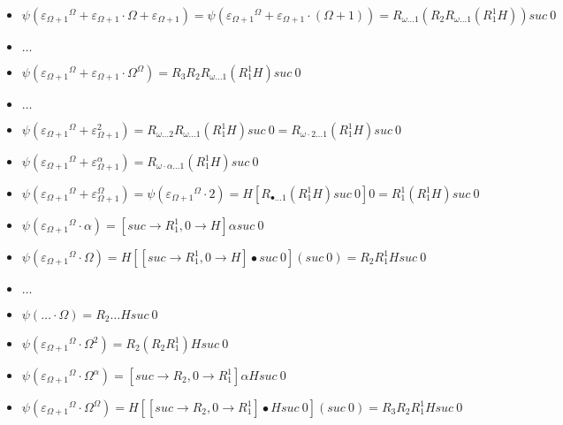 \documentclass[10pt]{article}
\begin{document}
\begin{itemize}
\item \( \psi({\varepsilon_{\Omega+1}}^\Omega+\varepsilon_{\Omega+1} \cdot \Omega+\varepsilon_{\Omega+1}) = \psi({\varepsilon_{\Omega+1}}^\Omega+\varepsilon_{\Omega+1} \cdot (\Omega+1)) = R_{\omega \ldots 1} (R_2 R_{\omega \ldots 1} (R^1_1 H)) suc\ 0 \)

\item \( \ldots \)

\item \( \psi({\varepsilon_{\Omega+1}}^\Omega+\varepsilon_{\Omega+1} \cdot \Omega^\Omega) = R_3 R_2 R_{\omega \ldots 1} (R^1_1 H) suc\ 0 \)

\item \( \ldots \)

\item \( \psi({\varepsilon_{\Omega+1}}^\Omega+\varepsilon_{\Omega+1}^2) = R_{\omega \ldots 2} R_{\omega \ldots 1} (R^1_1 H) suc\ 0 = R_{\omega \cdot 2 \ldots 1} (R^1_1 H) suc\ 0 \)

\item \( \psi({\varepsilon_{\Omega+1}}^\Omega+\varepsilon_{\Omega+1}^\alpha) = R_{\omega \cdot \alpha \ldots 1} (R^1_1 H) suc\ 0 \)

\item \( \psi({\varepsilon_{\Omega+1}}^\Omega+\varepsilon_{\Omega+1}^\Omega) = \psi({\varepsilon_{\Omega+1}}^\Omega \cdot 2) = H [R_{\bullet \ldots 1} (R^1_1 H) suc\ 0] 0 = R^1_1 (R^1_1 H) suc\ 0 \)

\item \( \psi({\varepsilon_{\Omega+1}}^\Omega \cdot \alpha) = [suc \rightarrow R^1_1, 0 \rightarrow H] \alpha suc\ 0 \)

\item \( \psi({\varepsilon_{\Omega+1}}^\Omega \cdot \Omega) = H [[suc \rightarrow R^1_1, 0 \rightarrow H] \bullet suc\ 0] (suc\ 0) = R_2 R^1_1 H suc\ 0 \)

\item \( \ldots \)

\item \( \psi(\ldots \cdot \Omega) = R_2 \ldots H suc\ 0 \)

\item \( \psi({\varepsilon_{\Omega+1}}^\Omega \cdot \Omega^2) = R_2 (R_2 R^1_1) H suc\ 0 \)

\item \( \psi({\varepsilon_{\Omega+1}}^\Omega \cdot \Omega^\alpha) = [suc \rightarrow R_2, 0 \rightarrow R^1_1] \alpha H suc\ 0 \)

\item \( \psi({\varepsilon_{\Omega+1}}^\Omega \cdot \Omega^\Omega) = H [[suc \rightarrow R_2, 0 \rightarrow R^1_1] \bullet H suc\ 0] (suc\ 0) = R_3 R_2 R^1_1 H suc\ 0 \)


\end{itemize}
\end{document}

